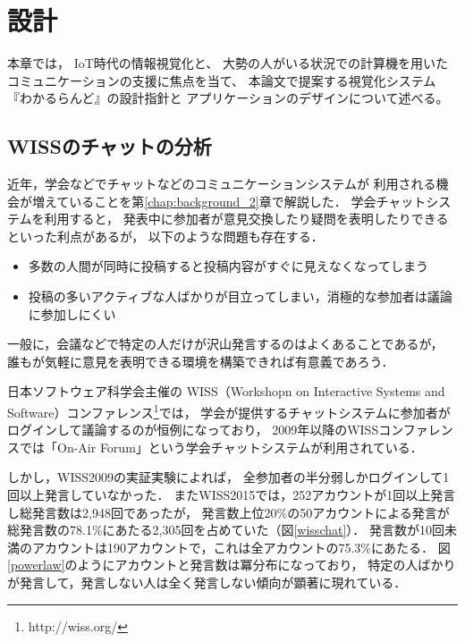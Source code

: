 \chapter{設計}
\label{chap:wakaruland}

本章では，
IoT時代の情報視覚化と、
大勢の人がいる状況での計算機を用いたコミュニケーションの支援に焦点を当て、
本論文で提案する視覚化システム『わかるらんど』の設計指針と
アプリケーションのデザインについて述べる。

\newpage

\section{WISSのチャットの分析}

近年，学会などでチャットなどのコミュニケーションシステムが
利用される機会が増えていることを第\ref{chap:background_2}章で解説した．
学会チャットシステムを利用すると，
発表中に参加者が意見交換したり疑問を表明したりできるといった利点があるが，
以下のような問題も存在する．

\begin{itemize}
\item 多数の人間が同時に投稿すると投稿内容がすぐに見えなくなってしまう
\item 投稿の多いアクティブな人ばかりが目立ってしまい，消極的な参加者は議論に参加しにくい
\end{itemize}

一般に，会議などで特定の人だけが沢山発言するのはよくあることであるが，
誰もが気軽に意見を表明できる環境を構築できれば有意義であろう．

日本ソフトウェア科学会主催の
WISS（Workshopn on Interactive Systems and Software）コンファレンス\footnote{\textsf{http://wiss.org/}}では，
学会が提供するチャットシステムに参加者がログインして議論するのが恒例になっており\cite{wiss_challenge}，
2009年以降のWISSコンファレンスでは「On-Air Forum」\cite{nishida2011}という学会チャットシステムが利用されている．

しかし，WISS2009の実証実験によれば，
全参加者の半分弱しかログインして1回以上発言していなかった．
またWISS2015では，252アカウントが1回以上発言し総発言数は2,948回であったが，
発言数上位20\%の50アカウントによる発言が
総発言数の78.1\%にあたる2,305回を占めていた（図\ref{wisschat}）．
発言数が10回未満のアカウントは190アカウントで，これは全アカウントの75.3\%にあたる．
図\ref{powerlaw}のようにアカウントと発言数は冪分布になっており，
特定の人ばかりが発言して，発言しない人は全く発言しない傾向が顕著に現れている．

